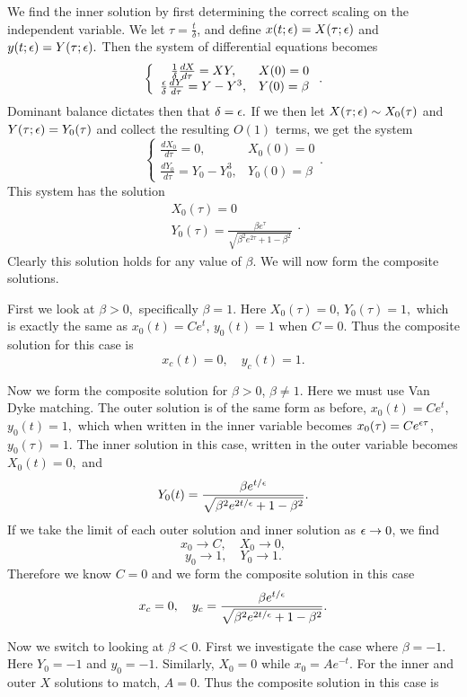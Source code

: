 \item We find the inner solution by first determining the correct scaling on the independent variable. We let $\tau=\frac{t}{\delta}$, and define $x(t;\epsilon)=X(\tau;\epsilon)$ and $y(t;\epsilon)=Y(\tau;\epsilon).$ Then the system of differential equations becomes
    $$\left\{\begin{array}{cc}\frac{1}{\delta}\frac{dX}{d\tau}=XY,&X(0)=0\\\frac{\epsilon}{\delta}\frac{dY}{d\tau}=Y-Y^3,&Y(0)=\beta\end{array}\right..$$
    Dominant balance dictates then that $\delta=\epsilon.$ If we then let $X(\tau;\epsilon)\sim X_0(\tau)$ and $Y(\tau;\epsilon)=Y_0(\tau)$ and collect the resulting $O(1)$ terms, we get the system
    $$\left\{\begin{array}{cc}\frac{dX_0}{d\tau}=0,&X_0(0)=0\\ \frac{dY_0}{d\tau}=Y_0-Y_0^3,&Y_0(0)=\beta\end{array}\right..$$
    This system has the solution
    $$\begin{array}{c}X_0(\tau)=0\\Y_0(\tau)=\frac{\beta e^{\tau}}{\sqrt{\beta^2e^{2\tau}+1-\beta^2}}\end{array}.$$
    Clearly this solution holds for any value of $\beta.$ We will now form the composite solutions.
    \benum
    \item First we look at $\beta>0,$ specifically $\beta=1.$ Here $X_0(\tau)=0$, $Y_0(\tau)=1,$ which is exactly the same as $x_0(t)=Ce^t$, $y_0(t)=1$ when $C=0.$ Thus the composite solution for this case is
        $$x_c(t)=0,\quad y_c(t)=1.$$
    \item Now we form the composite solution for $\beta>0$, $\beta\neq 1.$ Here we must use Van Dyke matching. The outer solution is of the same form as before, $x_0(t)=Ce^t$, $y_0(t)=1,$ which when written in the inner variable becomes $x_0(\tau)=Ce^{\epsilon\tau}$, $y_0(\tau)=1.$ The inner solution in this case, written in the outer variable becomes $X_0(t)=0,$ and
        $$Y_0(t)=\frac{\beta e^{t/\epsilon}}{\sqrt{\beta^2e^{2t/\epsilon}+1-\beta^2}}.$$
        If we take the limit of each outer solution and inner solution as $\epsilon\to0 $, we find
        $$x_0\to C,\quad X_0\to 0,$$
        $$y_0\to1,\quad Y_0\to 1.$$
        Therefore we know $C=0$ and we form the composite solution in this case
        $$x_c=0,\quad y_c=\frac{\beta e^{t/\epsilon}}{\sqrt{\beta^2e^{2t/\epsilon}+1-\beta^2}}.$$
    \item Now we switch to looking at $\beta<0.$ First we investigate the case where $\beta=-1.$ Here $Y_0=-1$ and $y_0=-1.$ Similarly, $X_0=0$ while $x_0=Ae^{-t}$. For the inner and outer $X$ solutions to match, $A=0$. Thus the composite solution in this case is
